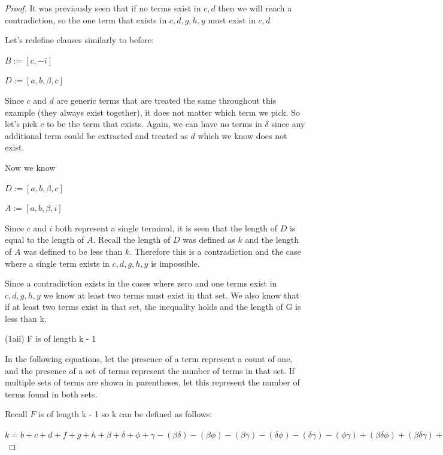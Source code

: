 \documentclass[manuscript]{acmart}
\begin{document}
\begin{proof}
        It was previously seen that if no terms exist in {$c, d$} then we will reach a contradiction, so the one term that exists in {$c, d, g, h, y$} must exist in {$c, d$}

        Let's redefine clauses similarly to before:

        $B := [c, -i]$

        $D := [a, b, \beta, c]$

        Since $c$ and $d$ are generic terms that are treated the same throughout this example (they always exist together), it does not matter which term we pick. So let's pick $c$ to be the term that exists. Again, we can have no terms in $\delta$ since any additional term could be extracted and treated as $d$ which we know does not exist. 

        Now we know

        $D := [a, b, \beta, c]$

        $A := [a, b, \beta, i]$

        Since $c$ and $i$ both represent a single terminal, it is seen that the length of $D$ is equal to the length of $A$. Recall the length of $D$ was defined as $k$ and the length of $A$ was defined to be less than $k$. Therefore this is a contradiction and the case where a single term exists in {$c, d, g, h, y$} is impossible.

        Since a contradiction exists in the cases where zero and one terms exist in {$c, d, g, h, y$} we know at least two terms must exist in that set. We also know that if at least two terms exist in that set, the inequality holds and the length of G is less than k.

        (1aii) F is of length k - 1

        In the following equations, let the presence of a term represent a count of one,
        and the presence of a set of terms represent the number of terms in that set. If
        multiple sets of terms are shown in parentheses, let this represent the number
        of terms found in both sets.
        
        Recall $F$ is of length k - 1 so k can be defined as follows:
        
        $k = b + c + d + f + g + h 
        + \beta + \delta + \phi + \gamma
        - (\beta \delta) - (\beta \phi) - (\beta \gamma) - (\delta \phi) - (\delta \gamma) - (\phi \gamma)
        + (\beta \delta \phi) + (\beta \delta \gamma) + (\beta \phi \gamma) + (\delta \phi \gamma)
        - (\beta \delta \phi \gamma)
        + 1
        $


\end{proof}
\end{document}
